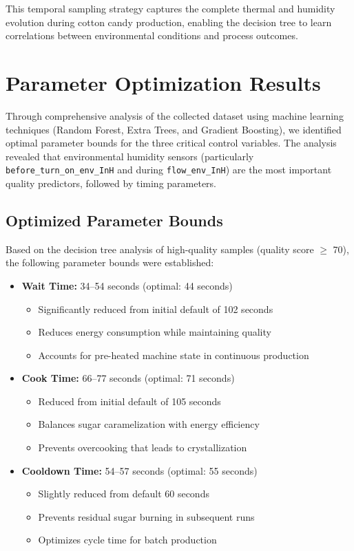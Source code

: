 This temporal sampling strategy captures the complete thermal and humidity evolution during cotton candy production, enabling the decision tree to learn correlations between environmental conditions and process outcomes.

\section{Parameter Optimization Results}
\label{sec:parameter-optimization}
Through comprehensive analysis of the collected dataset using machine learning techniques (Random Forest, Extra Trees, and Gradient Boosting), we identified optimal parameter bounds for the three critical control variables. The analysis revealed that environmental humidity sensors (particularly \texttt{before\_turn\_on\_env\_InH} and during \texttt{flow\_env\_InH}) are the most important quality predictors, followed by timing parameters.

\subsection{Optimized Parameter Bounds}

Based on the decision tree analysis of high-quality samples (quality score $\geq$ 70), the following parameter bounds were established:

\begin{itemize}
    \item \textbf{Wait Time:} 34--54 seconds (optimal: 44 seconds)
    \begin{itemize}
        \item Significantly reduced from initial default of 102 seconds
        \item Reduces energy consumption while maintaining quality
        \item Accounts for pre-heated machine state in continuous production
    \end{itemize}
    
    \item \textbf{Cook Time:} 66--77 seconds (optimal: 71 seconds)
    \begin{itemize}
        \item Reduced from initial default of 105 seconds
        \item Balances sugar caramelization with energy efficiency
        \item Prevents overcooking that leads to crystallization
    \end{itemize}
    
    \item \textbf{Cooldown Time:} 54--57 seconds (optimal: 55 seconds)
    \begin{itemize}
        \item Slightly reduced from default 60 seconds
        \item Prevents residual sugar burning in subsequent runs
        \item Optimizes cycle time for batch production
    \end{itemize}
\end{itemize}

